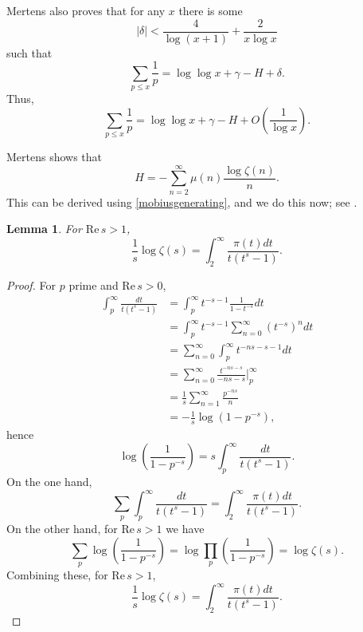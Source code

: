\documentclass{article}
\def\Re{\ensuremath{\mathrm{Re}}\,}
\newtheorem{lemma}[theorem]{Lemma}
\begin{document}
Mertens \cite{mertens} also proves that for any $x$ there is some 
\[
|\delta|< \frac{4}{\log(x+1)} + \frac{2}{x\log x}
\]
such that
\[
\sum_{p \leq x} \frac{1}{p} = \log \log x + \gamma - H + \delta.
\]
Thus,
\[
\sum_{p \leq x} \frac{1}{p} = \log \log x + \gamma - H + O\left( \frac{1}{\log x} \right).
\]

Mertens shows that 
\[
H=-\sum_{n=2}^\infty \mu(n) \frac{\log \zeta(n)}{n}.
\]
This can be derived using \eqref{mobiusgenerating}, and we do this now; see \cite{lindqvist}.

\begin{lemma}
For $\Re s>1$,
\[
\frac{1}{s} \log \zeta(s) = \int_2^\infty \frac{\pi(t) dt}{t(t^s-1)}.
\]
\label{logzetalemma}
\end{lemma}
\begin{proof}
For $p$ prime and $\Re s>0$,
\begin{align*}
\int_p^\infty \frac{dt}{t(t^s-1)}&=
\int_p^\infty t^{-s-1}\frac{1}{1-t^{-s}} dt\\
&=\int_p^\infty t^{-s-1} \sum_{n=0}^\infty (t^{-s})^n dt\\
&=\sum_{n=0}^\infty \int_p^\infty t^{-ns-s-1} dt\\
&=\sum_{n=0}^\infty \frac{t^{-ns-s}}{-ns-s} \bigg|_p^\infty\\
&=\frac{1}{s} \sum_{n=1}^\infty \frac{p^{-ns}}{n}\\
&=-\frac{1}{s} \log(1-p^{-s}),
\end{align*}
hence
\[
 \log \left( \frac{1}{1-p^{-s}} \right) = s  \int_p^\infty \frac{dt}{t(t^s-1)}.
\]
On the one hand,
\[
\sum_p  \int_p^\infty \frac{dt}{t(t^s-1)} = \int_2^\infty \frac{\pi(t) dt}{t(t^s-1)}.
\]
On the other hand, for $\Re s>1$ we have
\[
\sum_p  \log \left( \frac{1}{1-p^{-s}} \right) = \log \prod_p  \left( \frac{1}{1-p^{-s}} \right)
=\log \zeta(s). 
\]
Combining these, for $\Re s>1$,
\[
\frac{1}{s} \log \zeta(s) = \int_2^\infty \frac{\pi(t) dt}{t(t^s-1)}.
\]
\end{proof}
\end{document}
